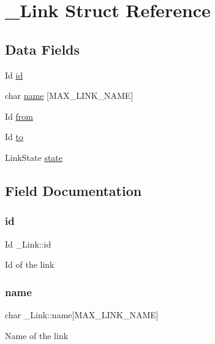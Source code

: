 \hypertarget{struct__Link}{}\section{\+\_\+\+Link Struct Reference}
\label{struct__Link}
\subsection*{Data Fields}
\begin{DoxyCompactItemize}
\item 
Id \hyperlink{struct__Link_a151212e7a8e8274c2a1ee991ba95878b}{id}
\item 
char \hyperlink{struct__Link_ac7b76fdc8029565d25ad0aae70c5675b}{name} \mbox{[}M\+A\+X\+\_\+\+L\+I\+N\+K\+\_\+\+N\+A\+ME\mbox{]}
\item 
Id \hyperlink{struct__Link_ae33a61999d11b202a1e1af285aaa84b0}{from}
\item 
Id \hyperlink{struct__Link_a54563ccd62fdc5057f55fa8f205d928c}{to}
\item 
Link\+State \hyperlink{struct__Link_a58ecee77b2af4dddadb7e8ff94fa0d15}{state}
\end{DoxyCompactItemize}


\subsection{Field Documentation}
\mbox{\label{struct__Link_a151212e7a8e8274c2a1ee991ba95878b}} 
\subsubsection{\texorpdfstring{id}{id}}
{\footnotesize\ttfamily Id \+\_\+\+Link\+::id}

Id of the link \mbox{\label{struct__Link_ac7b76fdc8029565d25ad0aae70c5675b}} 
\subsubsection{\texorpdfstring{name}{name}}
{\footnotesize\ttfamily char \+\_\+\+Link\+::name\mbox{[}M\+A\+X\+\_\+\+L\+I\+N\+K\+\_\+\+N\+A\+ME\mbox{]}}

Name of the link \mbox{\label{struct__Link_ae33a61999d11b202a1e1af285aaa84b0}} 
